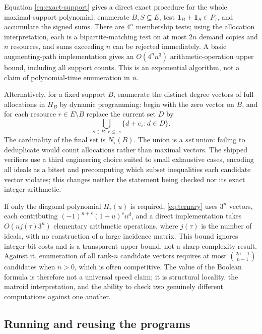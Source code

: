 \documentclass[11pt]{article}
\numberwithin{equation}{section}
\theoremstyle{definition}
\theoremstyle{remark}
\newcommand{\one}{\mathbf 1}
\begin{document}
Equation \eqref{eq:exact-support} gives a direct exact procedure for the whole
maximal-support polynomial: enumerate $B,S\subseteq E$, test
$\one_B+\one_S\in P_\tau$, and accumulate the signed sums. There are $4^n$
membership tests; using the allocation interpretation, each is a
bipartite-matching test on at most $2n$ demand copies and $n$ resources, and
sums exceeding $n$ can be rejected immediately. A basic augmenting-path
implementation gives an $O(4^nn^3)$ arithmetic-operation upper bound,
including all support counts. This is an exponential algorithm, not a claim of
polynomial-time enumeration in $n$.

Alternatively, for a fixed support $B$, enumerate the distinct degree vectors
of full allocations in $H_B$ by dynamic programming: begin with the zero
vector on $B$, and for each resource $r\in E\setminus B$ replace the current
set $D$ by
\[
 \bigcup_{s\in B:\,r\le_\tau s}\{d+e_s:d\in D\} .
\]
The cardinality of the final set is $N_\tau(B)$. The union is a \emph{set}
union: failing to deduplicate would count allocations rather than maximal
vectors. The shipped verifiers use a third engineering choice suited to small
exhaustive cases, encoding all ideals as a bitset and precomputing which
subset inequalities each candidate vector violates; this changes neither the
statement being checked nor its exact integer arithmetic.

If only the diagonal polynomial $H_\tau(u)$ is required, \eqref{eq:ternary}
uses $3^n$ vectors, each contributing $(-1)^{n+s}(1+u)^su^d$, and a direct
implementation takes $O(nj(\tau)3^n)$ elementary arithmetic operations, where
$j(\tau)$ is the number of ideals, with no construction of a large incidence
matrix. This bound ignores integer bit costs and is a transparent upper bound,
not a sharp complexity result. Against it, enumeration of all rank-$n$
candidate vectors requires at most $\binom{2n-1}{n-1}$ candidates when $n>0$,
which is often competitive. The value of the Boolean formula is therefore not
a universal speed claim; it is structural locality, the matroid
interpretation, and the ability to check two genuinely different computations
against one another.

\subsection{Running and reusing the programs}
\end{document}
